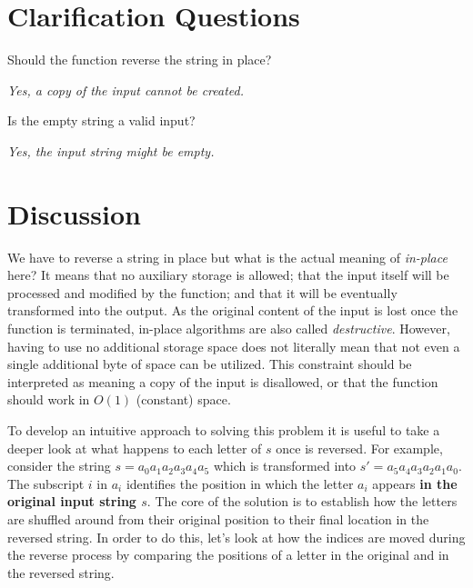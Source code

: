 \section{Clarification Questions}

\begin{QandA}
	\begin{questionitem} \begin{question} Should the function reverse the string in place?  \end{question} 	 
    \begin{answered}
		\textit{Yes, a copy of the input cannot be created.}
	\end{answered} \end{questionitem}

	\begin{questionitem} \begin{question} Is the empty string a valid input?  \end{question} 	 
    \begin{answered}
		\textit{Yes, the input string might be empty.}
	\end{answered} \end{questionitem}
	
\end{QandA}

\section{Discussion}
\label{string_reverse:sec:discussion}
We have to reverse a string in place but what is the actual meaning of
\textit{in-place} here? 
It means that no auxiliary storage is allowed; that the input itself will be processed and modified by the function;  and that it will be eventually transformed into the output.
As the original content of the input is lost once the function is terminated, in-place algorithms are also called \textit{destructive}.
However, having to use no additional storage space does not literally mean that not even a single additional byte of space can be utilized.
This constraint should be interpreted as meaning a copy of the input is disallowed, or that the function should work in $O(1)$ (constant) space.

To develop an intuitive approach to solving this problem it is useful to take a deeper look at what happens to each letter of $s$ once is reversed.
For example, consider the string $s=a_0 a_1 a_2 a_3 a_4 a_5$ which is transformed into $s'=a_5 a_4 a_3 a_2 a_1 a_0$.
The subscript $i$ in $a_i$ identifies the position in which the letter $a_i$ appears \textbf{in the original input string $s$}. 
The core of the solution is to establish how the letters are shuffled around from their original position to their final location in the reversed string.
In order to do this,  let's look at how the indices are moved during the reverse process by comparing the positions of a letter in the original and in the reversed string.

